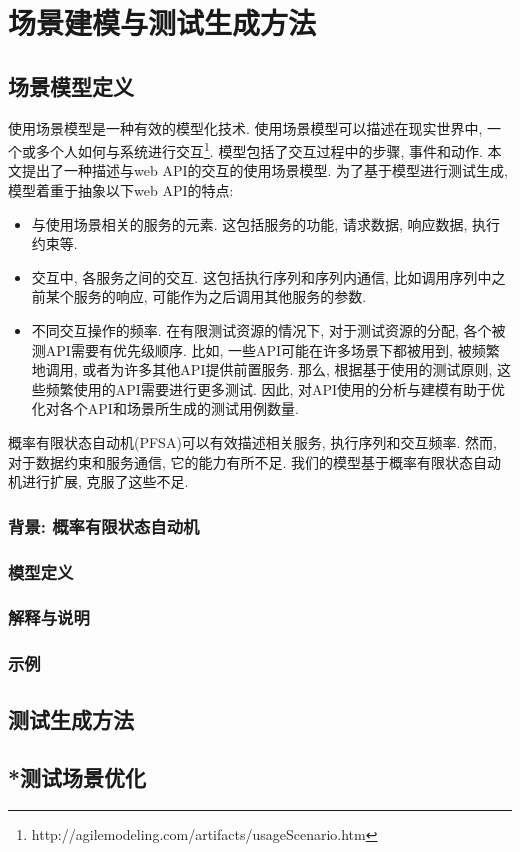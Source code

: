 \chapter{场景建模与测试生成方法}
    \section{场景模型定义}
        使用场景模型是一种有效的模型化技术. 使用场景模型可以描述在现实世界中, 一个或多个人如何与系统进行交互\footnote{http://agilemodeling.com/artifacts/usageScenario.htm}. 模型包括了交互过程中的步骤, 事件和动作. 本文提出了一种描述与web API的交互的使用场景模型. 为了基于模型进行测试生成, 模型着重于抽象以下web API的特点:
        
        \begin{itemize}
            \item 与使用场景相关的服务的元素. 这包括服务的功能, 请求数据, 响应数据, 执行约束等.
            
            \item 交互中, 各服务之间的交互. 这包括执行序列和序列内通信, 比如调用序列中之前某个服务的响应, 可能作为之后调用其他服务的参数.
            
            \item 不同交互操作的频率. 在有限测试资源的情况下, 对于测试资源的分配, 各个被测API需要有优先级顺序. 比如, 一些API可能在许多场景下都被用到, 被频繁地调用, 或者为许多其他API提供前置服务. 那么, 根据基于使用的测试原则, 这些频繁使用的API需要进行更多测试. 因此, 对API使用的分析与建模有助于优化对各个API和场景所生成的测试用例数量.
        \end{itemize}
        
        概率有限状态自动机(PFSA)可以有效描述相关服务, 执行序列和交互频率. 然而, 对于数据约束和服务通信, 它的能力有所不足. 我们的模型基于概率有限状态自动机进行扩展, 克服了这些不足.
        
        \subsection{背景: 概率有限状态自动机}
        
        \subsection{模型定义}
        
        \subsection{解释与说明}
        
        \subsection{示例}
    
    \section{测试生成方法}
    
    \section{*测试场景优化}

